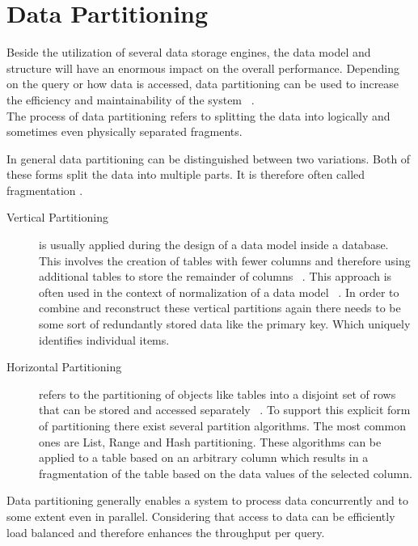 
\section{Data Partitioning}
\label{sec:part}

Beside the utilization of several data storage engines, the data model and structure 
will have an enormous impact on the overall performance. Depending on the query or 
how data is accessed, data partitioning can be used to increase the efficiency and 
maintainability of the system ~\cite{Agrawal_2004}.\\
The process of data partitioning refers to splitting the data into logically and sometimes even
physically separated fragments.

In general data partitioning can be distinguished between two variations.
Both of these forms split the data into multiple parts.
It is therefore often called fragmentation . 

\begin{description}
    \item [Vertical Partitioning] is usually applied during the design of a data model inside a 
    database. This involves the creation of tables with fewer columns and therefore using additional 
    tables to store the remainder of columns ~\cite{vertical_1984}. This approach is often used in the 
    context of normalization of a data model ~\cite{normalization_2012}. In order to combine and reconstruct 
    these vertical partitions again there needs to be some sort of redundantly stored data like the primary key.
    Which uniquely identifies individual items. 
    \item [Horizontal Partitioning] refers to the partitioning of objects like tables 
    into a disjoint set of rows that can be stored and accessed separately ~\cite{horizontal_1982}.
    To support this explicit form of partitioning there exist several partition algorithms.
    The most common ones are List, Range and Hash partitioning. These algorithms can be applied to a
    table based on an arbitrary column which results in a fragmentation of the table 
    based on the data values of the selected column.
\end{description}

Data partitioning generally enables a system to process data concurrently and 
to some extent even in parallel. Considering that access to data can be 
efficiently load balanced and therefore enhances the throughput per query.\\


